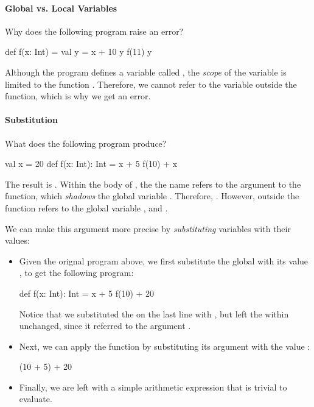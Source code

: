 \documentclass{book}
\begin{document}
\paragraph{Global vs. Local Variables}

Why does the following program raise an error?

%
\begin{scalacode}
def f(x: Int) = {
  val y = x + 10
  y
}
f(11)
y
\end{scalacode}

Although the program defines a variable called , the
\emph{scope} of the variable is limited to the function .
Therefore, we cannot refer to the variable outside the function, which
is why we get an error.

\paragraph{Substitution}

What does the following program produce?
%
\begin{scalacode}
val x = 20
def f(x: Int): Int = {
  x + 5
}
f(10) + x
\end{scalacode}

The result is . Within the body of , the
the name  refers to the argument to the function, which
\emph{shadows} the global variable . Therefore,
. However, outside the function 
refers to the global variable , and
.

We can make this argument more precise by \emph{substituting} variables
with their values:

\begin{itemize}

\item Given the orignal program above, we first substitute
the global  with its value , to get
the following program:
\begin{scalacode}
def f(x: Int): Int = {
  x + 5
}
f(10) + 20
\end{scalacode}
%
Notice that we substituted the  on the last line with ,
but left the  within  unchanged, since it referred
to the argument .

\item Next, we can apply the function  by substituting
its argument  with the value :
%
\begin{scalacode}
(10 + 5) + 20
\end{scalacode}

\item Finally, we are left with a simple arithmetic expression that is
trivial to evaluate.

\end{itemize}
\end{document}
